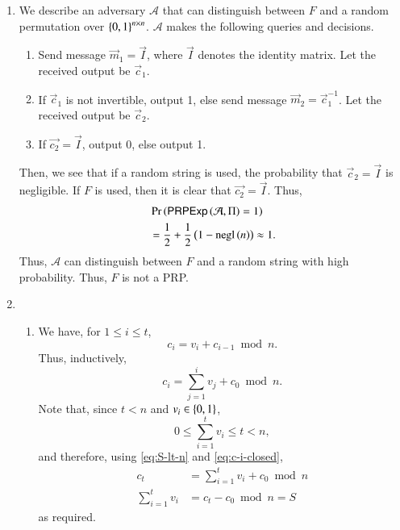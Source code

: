 \documentclass[journal,12pt,twocolumn]{IEEEtran}
\begin{document}
\begin{enumerate}
    \item We describe an adversary \(\mathcal{A}\) that can distinguish between
    \(F\) and a random permutation over \(\left\{0,1\right\}^{n\times{}n}\).
    \(\mathcal{A}\) makes the following queries and decisions.
        \begin{enumerate}
            \item Send message \(\vec{m}_1 = \vec{I}\), where \(\vec{I}\)
            denotes the identity matrix. Let the received output be
            \(\vec{c}_1\).
            \item If \(\vec{c}_1\) is not invertible, output 1, else send
            message \(\vec{m}_2 = \vec{c}_1^{-1}\). Let the received output be
            \(\vec{c}_2\).
            \item If \(\vec{c_2} = \vec{I}\), output 0, else output 1.
        \end{enumerate}
        Then, we see that if a random string is used, the probability that
        \(\vec{c}_2 = \vec{I}\) is negligible. If \(F\) is used, then it is
        clear that \(\vec{c_2} = \vec{I}\). Thus,
        \begin{align}
            &\Pr\left(\textsf{PRPExp}\left(\mathcal{A},\Pi\right) = 1\right) \nonumber \\
            &= \frac{1}{2} + \frac{1}{2}\left(1 - \textrm{negl}\left(n\right)\right) \approx 1.
        \end{align}
        Thus, \(\mathcal{A}\) can distinguish between \(F\) and a random string
        with high probability. Thus, \(F\) is not a PRP.
    
    \item 
    \begin{enumerate}
        \item We have, for \(1 \le i \le t\),
            \begin{equation}
                c_i = v_i + c_{i-1} \bmod{n}.
            \end{equation}
        Thus, inductively,
            \begin{equation}
                c_i = \sum_{j=1}^{i}v_j + c_0 \bmod{n}.
                \label{eq:c-i-closed}
            \end{equation}
        Note that, since \(t < n\) and \(v_i \in \left\{0,1\right\}\),
            \begin{equation}
                0 \le  \sum_{i=1}^{t}v_i \le t < n,
                \label{eq:S-lt-n}
            \end{equation}
        and therefore, using \eqref{eq:S-lt-n} and \eqref{eq:c-i-closed},
            \begin{align}
                c_t &= \sum_{i=1}^{t}v_i + c_0 \bmod{n} \\
                \sum_{i=1}^{t}v_i &= c_t - c_0 \bmod{n} = S
            \end{align}
        as required.
            

\end{enumerate}
\end{enumerate}
\end{document}
